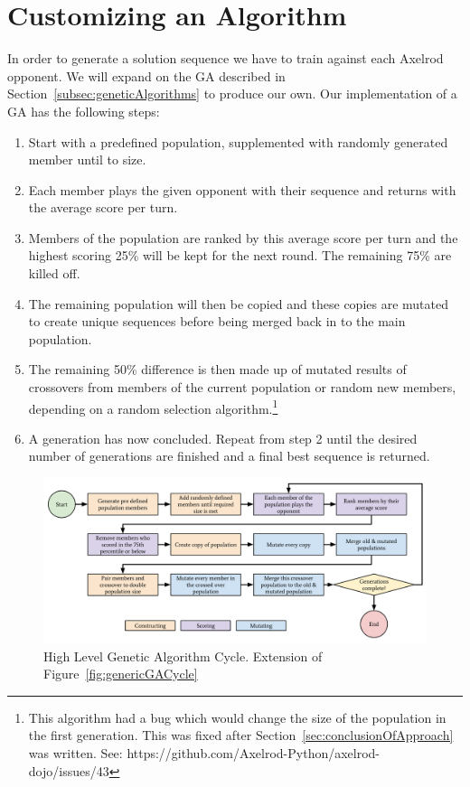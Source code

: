 \section{Customizing an Algorithm}\label{sec:buildingTheAlgorithm}
In order to generate a solution sequence we have to train against each Axelrod opponent.
We will expand on the GA described in Section~\ref{subsec:geneticAlgorithms} to produce our own.
Our implementation of a GA has the following steps:
\begin{enumerate}
    \item Start with a predefined population, supplemented with randomly generated member until to size.
    \item Each member plays the given opponent with their sequence and returns with the average score per turn.
    \item Members of the population are ranked by this average score per turn and the highest scoring 25\% will be kept for the next round.
    The remaining 75\% are killed off.
    \item The remaining population will then be copied and these copies are mutated to create unique sequences before being merged back in to the main population.
    \item The remaining 50\% difference is then made up of mutated results of crossovers from members of the current population or random new members, depending on a random selection algorithm.\footnote{This algorithm had a bug which would change the size of the population in the first generation.
    This was fixed after Section~\ref{sec:conclusionOfApproach} was written.
    See: https://github.com/Axelrod-Python/axelrod-dojo/issues/43}
    \item A generation has now concluded.
    Repeat from step 2 until the desired number of generations are finished and a final best sequence is returned.
\end{enumerate}

\begin{figure}[ht]
    \includegraphics[width=1.0\textwidth, center]{./img/flows/custom_ga_cycle}
    \caption{High Level Genetic Algorithm Cycle. Extension of Figure~\ref{fig:genericGACycle}}\label{fig:customGAcycle}
\end{figure}

